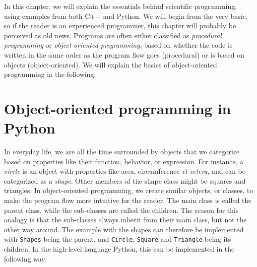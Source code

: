 In this chapter, we will explain the essentials behind scientific programming, using examples from both C++ and Python. We will begin from the very basic, so if the reader is an experienced programmer, this chapter will probably be perceived as old news. Programs are often either classified as \textit{procedural programming} or \textit{object-oriented programming}, based on whether the code is written in the same order as the program flow goes (procedural) or is based on objects (object-oriented). We will explain the basics of object-oriented programming in the following.

\section{Object-oriented programming in Python}
In everyday life, we are all the time surrounded by objects that we categorize based on properties like their function, behavior, or expression. For instance, a \textit{circle} is an object with properties like area, circumference \textit{et cetera}, and can be categorized as a \textit{shape}. Other members of the shape class might be squares and triangles. In object-oriented programming, we create similar objects, or classes, to make the program flow more intuitive for the reader. The main class is called the parent class, while the sub-classes are called the children. The reason for this analogy is that the sub-classes always inherit from their main class, but not the other way around. The example with the shapes can therefore be implemented with \texttt{Shapes} being the parent, and \texttt{Circle}, \texttt{Square} and \texttt{Triangle} being its children. In the high-level language Python, this can be implemented in the following way:

